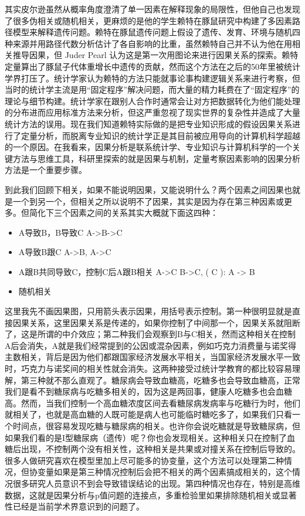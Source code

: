 \documentclass[]{tufte-book}
\providecommand{\tightlist}{%
  \setlength{\itemsep}{0pt}\setlength{\parskip}{0pt}}
\begin{document}
其实皮尔逊虽然从概率角度澄清了单一因素在解释现象的局限性，但他自己也发现了很多伪相关或随机相关，更麻烦的是他的学生赖特在豚鼠研究中构建了多因素路径模型来解释遗传问题。赖特在豚鼠遗传问题上假设了遗传、发育、环境与随机四种来源并用路径代数分析估计了各自影响的比重，虽然赖特自己并不认为他在用相关推导因果，但 Juder Pearl 认为这是第一次用图论来进行因果关系的探索。赖特定量算出了豚鼠子代体重增长中遗传的贡献，然而这个方法在之后的50年里被统计学界打压了。统计学家认为赖特的方法只能就事论事构建逻辑关系来进行考察，但当时的统计学主流是用``固定程序''解决问题，而大量的精力耗费在了``固定程序''的理论与细节构建。统计学家在跟别人合作时通常会让对方把数据转化为他们能处理的分布进而应用标准方法来分析，但这严重忽视了现实世界的复杂性并造成了大量统计方法的误用。现在我们知道赖特实际做的是把专业知识形成的假设因果关系进行了定量分析，而脱离专业知识的统计学正是其目前被应用导向的计算机科学超越的一个原因。在我看来，因果分析是联系统计学、专业知识与计算机科学的一个关键方法与思维工具，科研里探索的就是因果与机制，定量考察因素影响的因果分析方法是一个重要步骤。

到此我们回顾下相关，如果不能说明因果，又能说明什么？两个因素之间因果也就是一个到另一个，但相关之所以说明不了因果，其实是因为存在第三种因素或更多。但简化下三个因素之间的关系其实大概就下面这四种：

\begin{itemize}
\tightlist
\item
  A导致B，B导致C A-\textgreater B-\textgreater C
\item
  A导致B跟C A-\textgreater B, A-\textgreater C
\item
  A跟B共同导致C，控制C后A跟B相关 A-\textgreater C B-\textgreater C, ( C ): A -\textgreater{} B
\item
  随机相关
\end{itemize}

这里我先不画因果图，只用箭头表示因果，用括号表示控制。第一种很明显就是直接因果关系，这里因果关系是传递的，如果你控制了中间那一个，因果关系就阻断了，这是所谓的中介效应；第二种我们会观察到B与C相关，然而这种相关在控制A后会消失，A就是我们经常提到的公因或混杂因素，例如巧克力消费量与诺奖得主数相关，背后是因为他们都跟国家经济发展水平相关，当国家经济发展水平一致时，巧克力与诺奖间的相关性就会消失。这两种接受过统计学教育的都比较容易理解，第三种就不那么直观了。糖尿病会导致血糖高，吃糖多也会导致血糖高，正常我们是看不到糖尿病与吃糖多相关的，因为这是两回事，健康人吃糖多也会血糖高。然而，当我们控制一个高血糖浓度区间去看糖尿病发病率与吃糖行为时，他们就相关了，也就是高血糖的人既可能是病人也可能临时糖吃多了，如果我们只看一个时间点，很容易发现吃糖与糖尿病的相关。也许你会说吃糖就是导致糖尿病，但如果我们看的是I型糖尿病（遗传）呢？你也会发现相关。这种相关只在控制了血糖后出现，不控制两个没有相关性，这种相关是共果或对撞关系在控制后导致的。很多人做研究喜欢在模型里加上尽可能多的协变量，这个方法可以处理第二种情况，但协变量如果是第三种情况控制后会把不相关的两个因素搞成相关的，这个情况很多研究人员意识不到会导致错误结论的出现。第四种情况也存在，特别是高维数据，这就是因果分析与p值问题的连接点，多重检验里如果排除随机相关或显著性已经是当前学术界意识到的问题了。
\end{document}
